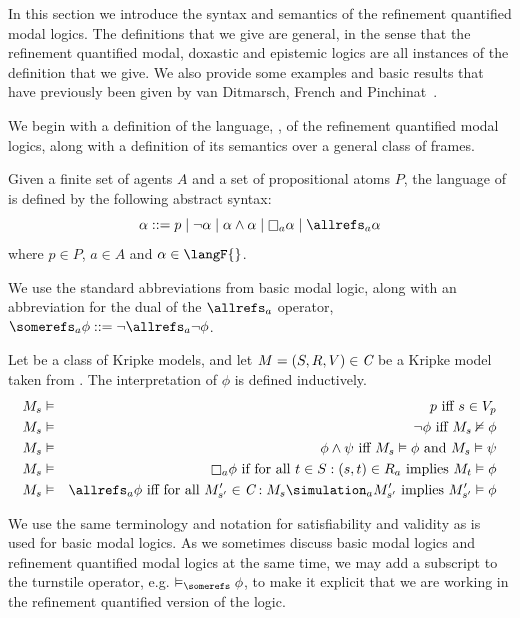 In this section we introduce the syntax and semantics of the refinement
quantified modal logics. The definitions that we give are general, in the sense
that the refinement quantified modal, doxastic and epistemic logics are all
instances of the definition that we give. We also provide some examples and
basic results that have previously been given by van Ditmarsch, French and
Pinchinat~\cite{french2010future}.

We begin with a definition of the language, \langF{}, of the refinement
quantified modal logics, along with a definition of its semantics over a general
class of frames.

\begin{definition}
Given a finite set of agents $A$ and a set of propositional atoms $P$, the
language of \langF{} is defined by the following abstract syntax:
$$
\alpha ::=  p \bnfalt
            \neg \alpha \bnfalt
            \alpha \land \alpha \bnfalt
            \knows_a \alpha \bnfalt
            \allrefs_a \alpha
$$
where $p \in P$, $a \in A$ and $\alpha \in \langF{}$.
\end{definition}

We use the standard abbreviations from basic modal logic, along with an
abbreviation for the dual of the $\allrefs_a$ operator, $\somerefs_a \phi ::=
\neg \allrefs_a \neg \phi$.

\begin{definition}
Let \classC{} be a class of Kripke models, and let $M = (S, R, V) \in \textit{C}$
be a Kripke model taken from \classC{}. The interpretation of $\phi$ is defined
inductively.
\begin{eqnarray*}
M_s &\entails& p \text{ iff } s \in V_p\\
M_s &\entails& \neg \phi \text{ iff } M_s \nentails \phi\\
M_s &\entails& \phi \land \psi \text{ iff } M_s \entails \phi \text{ and } M_s
\entails \psi\\
M_s &\entails& \knows_a \phi \text{ if for all } t \in S : (s, t) \in R_a \text{
implies } M_t \entails \phi\\
M_s &\entails& \allrefs_a \phi \text{ iff for all } M'_{s'} \in \classC : M_s
\simulation_a M'_{s'} \text{ implies } M'_{s'} \entails \phi
\end{eqnarray*}
\end{definition}

We use the same terminology and notation for satisfiability and validity as is
used for basic modal logics. As we sometimes discuss basic modal logics and
refinement quantified modal logics at the same time, we may add a subscript to
the turnstile operator, e.g. $\entails_\somerefs \phi$, to make it
explicit that we are working in the refinement quantified version of the logic.

